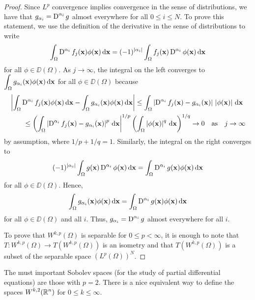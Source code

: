 \begin{proof}
Since $\displaystyle L^p$ convergence implies convergence in the
sense of distributions, we have that
$\displaystyle g_{\alpha_i} = \operatorname{D}^{\alpha_i} g$ almost everywhere for all
$0\leq i \leq N$.  To prove this statement, we use the definition of
the derivative in the sense of distributions to write
\[
\int_\Omega \operatorname{D}^{\alpha_i} f_j(\mathbf{x}) \phi(\mathbf{x}) \,\mathrm{d}{\mathbf{x}} =
(-1)^{|\alpha_i|} \int_\Omega f_j(\mathbf{x}) \operatorname{D}^{\alpha_i} \phi(\mathbf{x})
\,\mathrm{d}{\mathbf{x}}
\]
for all $\phi \in \DD(\Omega)$.  As $j\rightarrow \infty$, the
integral on the left converges to
$\displaystyle \int_\Omega g_{\alpha_i}(\mathbf{x}) \phi(\mathbf{x}) \,\mathrm{d}{\mathbf{x}}$
for all $\phi\in \DD(\Omega)$ because
\begin{align*}
&\left| \int_\Omega \operatorname{D}^{\alpha_i} f_j(\mathbf{x}) \phi(\mathbf{x}) \,\mathrm{d}{\mathbf{x}}
- \int_\Omega g_{\alpha_i}(\mathbf{x}) \phi(\mathbf{x}) \,\mathrm{d}{\mathbf{x}} \right|
\leq \int_\Omega \left| \operatorname{D}^{\alpha_i} f_j(\mathbf{x}) - g_{\alpha_i}(\mathbf{x})
\right| \, \left| \phi(\mathbf{x}) \right| \,\mathrm{d}{\mathbf{x}} \\
&\qquad \leq
\left(\int_\Omega \left| \operatorname{D}^{\alpha_i} f_j(\mathbf{x}) - g_{\alpha_i}(\mathbf{x})
\right|^p \,\mathrm{d}{\mathbf{x}} \right|^{1/p}
\left( \int_\Omega \left| \phi(\mathbf{x}) \right|^q \,\mathrm{d}{\mathbf{x}} \right)^{1/q}
\to 0 \quad \text{as} \quad j \to \infty
\end{align*}
by assumption, where $1/p + 1/q = 1$.  Similarly,
the integral on the right converges to
\[
(-1)^{|\alpha_i|} \int_\Omega g(\mathbf{x}) \operatorname{D}^{\alpha_i} \phi(\mathbf{x})
\,\mathrm{d}{\mathbf{x}} = \int_\Omega \operatorname{D}^{\alpha_i} g(\mathbf{x}) \phi(\mathbf{x})
\,\mathrm{d}{\mathbf{x}}
\]
for all $\phi\in \DD(\Omega)$.  Hence,
\[
 \int_\Omega g_{\alpha_i}(\mathbf{x}) \phi(\mathbf{x}) \,\mathrm{d}{\mathbf{x}}
= \int_\Omega \operatorname{D}^{\alpha_i} g(\mathbf{x}) \phi(\mathbf{x})
\,\mathrm{d}{\mathbf{x}}
\]
for all $\phi\in \DD(\Omega)$ and all $i$.  Thus,
$\displaystyle g_{\alpha_i} = \operatorname{D}^{\alpha_i} g$ almost everywhere for all $i$.

 To prove that $\displaystyle W^{k,p}(\Omega)$ is separable for
$0\leq p < \infty$, it is enough to note that
$\displaystyle T : W^{k,p}(\Omega) \rightarrow T\left(W^{k,p}(\Omega)\right)$ is
an isometry and that $\displaystyle T\left(W^{k,p}(\Omega)\right)$ is
a subset of the separable space $\displaystyle (L^p(\Omega))^N$.
\end{proof}

The must important Sobolev spaces (for the study of partial
differential equations) are those with $p=2$.  There is a nice
equivalent way to define the spaces
$\displaystyle W^{k,2}(\mathbb{R}^n)$ for $0\leq k \leq \infty$.


